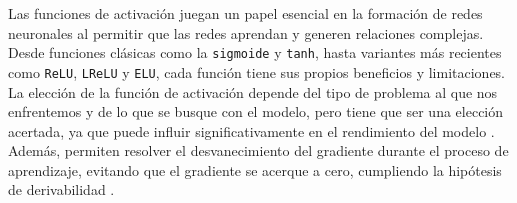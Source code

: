 \newpage

Las funciones de activación juegan un papel esencial en la formación de redes neuronales al permitir que las redes aprendan y generen relaciones complejas. Desde funciones clásicas como la \lstinline|sigmoide| y \lstinline|tanh|, hasta variantes más recientes como \lstinline|ReLU|, \lstinline|LReLU| y \lstinline|ELU|, cada función tiene sus propios beneficios y limitaciones. La elección de la función de activación depende del tipo de problema al que nos enfrentemos y de lo que se busque con el modelo, pero tiene que ser una elección acertada, ya que puede influir significativamente en el rendimiento del modelo \citep{pajares2021aprendizaje}. Además, permiten resolver el desvanecimiento del gradiente durante el proceso de aprendizaje, evitando que el gradiente se acerque a cero, cumpliendo la hipótesis de derivabilidad \citep{pajares2021aprendizaje}.




